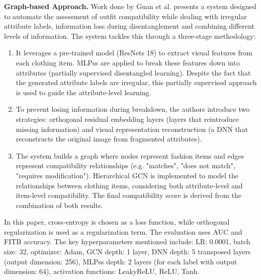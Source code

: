 \vspace{5mm}

\textbf{Graph-based Approach.}
Work done by Guan et al. presents a system designed to automate the assessment of outfit compatibility while dealing with irregular attribute labels, information loss during disentanglement and combining different levels of information. The system tackles this through a three-stage methodology: \cite[vgl.]{guan_partially_2022}
\begin{enumerate}
  \item It leverages a pre-trained model (\acsp{ResNet} 18) to extract visual features from each clothing item. \acsp{MLPs} are applied to break these features down into attributes (partially supervised disentangled learning). Despite the fact that the generated attribute labels are irregular, this partially supervised approach is used to guide the attribute-level learning.
  \item To prevent losing information during breakdown, the authors introduce two strategies: orthogonal residual embedding layers (layers that reintroduce missing information) and visual representation reconstruction (a \acs{DNN} that reconstructs the original image from fragmented attributes).
  \item The system builds a graph where nodes represent fashion items and edges represent compatibility relationships (e.g. "matches", "does not match", "requires modification"). Hierarchical \acs{GCN} is implemented to model the relationships between clothing items, considering both attribute-level and item-level compatibility. The final compatibility score is derived from the combination of both results.
\end{enumerate}
In this paper, cross-entropy is chosen as a loss function, while orthogonal regularization is used as a regularization term. The evaluation uses \acs{AUC} and \acs{FITB} accuracy. The key hyperparameters mentioned include: \acs{LR}: 0.0001, batch size: 32, optimizer: Adam, \acs{GCN} depth: 1 layer, \acs{DNN} depth: 5 transposed layers (output dimension: 256), \acsp{MLPs} depth: 2 layers (for each label with output dimension: 64), activation functions: LeakyReLU, \acs{ReLU}, Tanh. \cite[vgl.]{guan_partially_2022}

\vspace{5mm}

